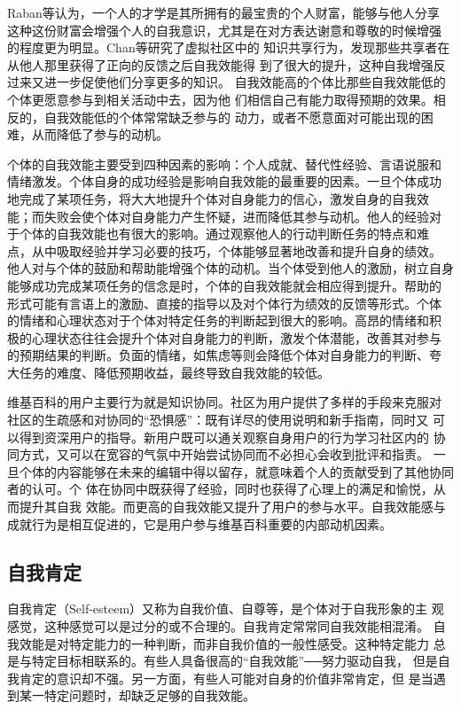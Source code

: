 Raban等认为，一个人的才学是其所拥有的最宝贵的个人财富，能够与他人分享
这种这份财富会增强个人的自我意识，尤其是在对方表达谢意和尊敬的时候增强
的程度更为明显\cite{raban2007investigating}。Chan等研究了虚拟社区中的
知识共享行为，发现那些共享者在从他人那里获得了正向的反馈之后自我效能得
到了很大的提升，这种自我增强反过来又进一步促使他们分享更多的知识。
自我效能高的个体比那些自我效能低的个体更愿意参与到相关活动中去，因为他
们相信自己有能力取得预期的效果。相反的，自我效能低的个体常常缺乏参与的
动力，或者不愿意面对可能出现的困难，从而降低了参与的动机。

个体的自我效能主要受到四种因素的影响：个人成就、替代性经验、言语说服和
情绪激发。个体自身的成功经验是影响自我效能的最重要的因素。一旦个体成功
地完成了某项任务，将大大地提升个体对自身能力的信心，激发自身的自我效
能；而失败会使个体对自身能力产生怀疑，进而降低其参与动机。他人的经验对
于个体的自我效能也有很大的影响。通过观察他人的行动判断任务的特点和难
点，从中吸取经验并学习必要的技巧，个体能够显著地改善和提升自身的绩效。
他人对与个体的鼓励和帮助能增强个体的动机。当个体受到他人的激励，树立自身
能够成功完成某项任务的信念是时，个体的自我效能就会相应得到提升。帮助的
形式可能有言语上的激励、直接的指导以及对个体行为绩效的反馈等形式。个体
的情绪和心理状态对于个体对特定任务的判断起到很大的影响。高昂的情绪和积
极的心理状态往往会提升个体对自身能力的判断，激发个体潜能，改善其对参与
的预期结果的判断。负面的情绪，如焦虑等则会降低个体对自身能力的判断、夸
大任务的难度、降低预期收益，最终导致自我效能的较低。

维基百科的用户主要行为就是知识协同。社区为用户提供了多样的手段来克服对
社区的生疏感和对协同的“恐惧感”：既有详尽的使用说明和新手指南，同时又
可以得到资深用户的指导。新用户既可以通关观察自身用户的行为学习社区内的
协同方式，又可以在宽容的气氛中开始尝试协同而不必担心会收到批评和指责。
一旦个体的内容能够在未来的编辑中得以留存，就意味着个人的贡献受到了其他协同者的认可。个
体在协同中既获得了经验，同时也获得了心理上的满足和愉悦，从而提升其自我
效能。而更高的自我效能又提升了用户的参与水平。自我效能感与成就行为是相互促进的，它是用户参与维基百科重要的内部动机因素。

\subsection{自我肯定}
\label{sec:self-esteem}

自我肯定（Self-esteem）又称为自我价值、自尊等，是个体对于自我形象的主
观感觉，这种感觉可以是过分的或不合理的。自我肯定常常同自我效能相混淆。
自我效能是对特定能力的一种判断，而非自我价值的一般性感受。这种特定能力
总是与特定目标相联系的。有些人具备很高的“自我效能”──努力驱动自我，
但是自我肯定的意识却不强。另一方面，有些人可能对自身的价值非常肯定，但
是当遇到某一特定问题时，却缺乏足够的自我效能。

